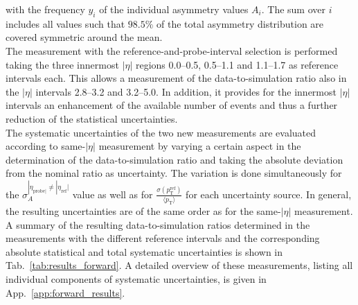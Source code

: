with the frequency $y_i$ of the individual asymmetry values $A_i$. The sum over $i$ includes all values such that $98.5\%$ of the total asymmetry distribution are covered symmetric around the mean.\\
The measurement with the reference-and-probe-interval selection is performed taking the three innermost $|\eta|$ regions 0.0--0.5, 0.5--1.1 and 1.1--1.7 as reference intervals each. This allows a measurement of the data-to-simulation ratio also in the $|\eta|$ intervals 2.8--3.2 and 3.2--5.0. In addition, it provides for the innermost $|\eta|$ intervals an enhancement of the available number of events and thus a further reduction of the statistical uncertainties.\\
The systematic uncertainties of the two new measurements are evaluated according to same-$|\eta|$ measurement by varying a certain aspect in the determination of the data-to-simulation ratio and taking the absolute deviation from the nominal ratio as uncertainty. The variation is done simultaneously for the $\sigma^{ |\eta_{\mathrm{probe}|} \neq |\eta_{\mathrm{ref}}|}_{A}$ value as well as for $\frac{\sigma (p^\mathrm{ref}_\mathrm{T})}{{\langle p_\mathrm{T} \rangle}}$ for each uncertainty source. In general, the resulting uncertainties are of the same order as for the same-$|\eta|$ measurement. \\
A summary of the resulting data-to-simulation ratios determined in the measurements with the different reference intervals and the corresponding absolute statistical and total systematic uncertainties is shown in Tab.~\ref{tab:results_forward}. A detailed overview of these measurements, listing all individual components of systematic uncertainties, is given in App.~\ref{app:forward_results}. 
